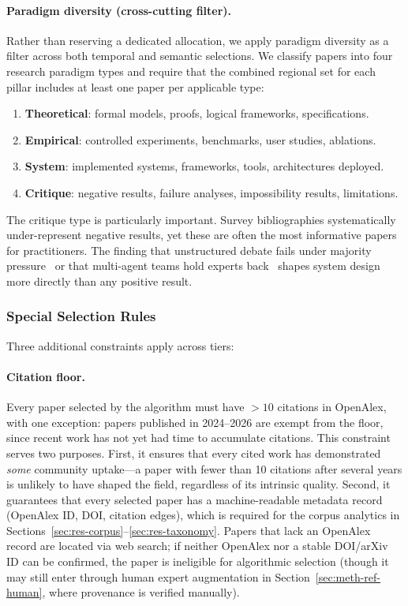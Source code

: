 \documentclass{article}
\begin{document}
\paragraph{Paradigm diversity (cross-cutting filter).}
Rather than reserving a dedicated allocation, we apply paradigm diversity as a
filter across both temporal and semantic selections. We classify papers into four
research paradigm types and require that the combined regional set for each pillar
includes at least one paper per applicable type:

\begin{enumerate}[label=(\roman*), itemsep=2pt]
  \item \textbf{Theoretical}: formal models, proofs, logical frameworks, specifications.
  \item \textbf{Empirical}: controlled experiments, benchmarks, user studies, ablations.
  \item \textbf{System}: implemented systems, frameworks, tools, architectures deployed.
  \item \textbf{Critique}: negative results, failure analyses, impossibility results, limitations.
\end{enumerate}

\noindent
The critique type is particularly important. Survey bibliographies systematically
under-represent negative results, yet these are often the most informative papers
for practitioners. The finding that unstructured debate fails under majority
pressure~\citep{debate2025can} or that multi-agent teams hold experts
back~\citep{pappu2026multiagent} shapes system design more directly than any
positive result.

\subsubsection{Special Selection Rules}

Three additional constraints apply across tiers:

\paragraph{Citation floor.}
Every paper selected by the algorithm must have $> 10$ citations in OpenAlex,
with one exception: papers published in 2024--2026 are exempt from the floor,
since recent work has not yet had time to accumulate citations. This constraint
serves two purposes. First, it ensures that every cited work has demonstrated
\emph{some} community uptake---a paper with fewer than 10 citations after
several years is unlikely to have shaped the field, regardless of its intrinsic
quality. Second, it guarantees that every selected paper has a machine-readable
metadata record (OpenAlex ID, DOI, citation edges), which is required for the
corpus analytics in Sections~\ref{sec:res-corpus}--\ref{sec:res-taxonomy}.
Papers that lack an OpenAlex record are located via web search; if neither
OpenAlex nor a stable DOI/arXiv ID can be confirmed, the paper is ineligible
for algorithmic selection (though it may still enter through human expert
augmentation in Section~\ref{sec:meth-ref-human}, where provenance is verified
manually).
\end{document}
